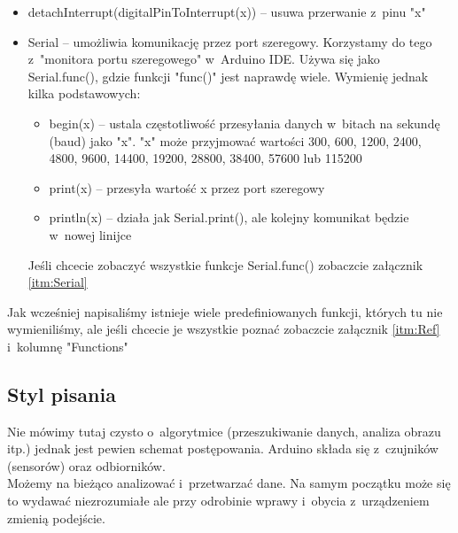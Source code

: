 \documentclass[a4paper,12pt, twoside]{article}
\begin{document}
\begin{itemize}
		\item detachInterrupt(digitalPinToInterrupt(x)) -- usuwa przerwanie z~pinu "x"
		\item Serial -- umożliwia komunikację przez port szeregowy. Korzystamy do tego z~"monitora portu szeregowego" w~Arduino IDE. Używa się jako Serial.func(), gdzie funkcji "func()" jest naprawdę wiele. Wymienię jednak kilka podstawowych:
			\begin{itemize}
				\item begin(x) -- ustala częstotliwość przesyłania danych w~bitach na sekundę (baud) jako "x". "x" może przyjmować wartości 300, 600, 1200, 2400, 4800, 9600, 14400, 19200, 28800, 38400, 57600 lub 115200
				\item print(x) -- przesyła wartość x przez port szeregowy
				\item println(x) -- działa jak Serial.print(), ale kolejny komunikat będzie w~nowej linijce
			\end{itemize}
			Jeśli chcecie zobaczyć wszystkie funkcje Serial.func() zobaczcie załącznik \ref{itm:Serial}
	\end{itemize}
	Jak wcześniej napisaliśmy istnieje wiele predefiniowanych funkcji, których tu nie wymieniliśmy, ale jeśli chcecie je wszystkie poznać zobaczcie załącznik \ref{itm:Ref} i~kolumnę "Functions"


	\subsection {Styl pisania}
	Nie mówimy tutaj czysto o~algorytmice (przeszukiwanie danych, analiza obrazu itp.) jednak jest pewien schemat postępowania. Arduino składa się z~czujników (sensorów) oraz odbiorników. %
	\\
	Możemy  na bieżąco analizować i~przetwarzać dane. Na samym początku może się to wydawać niezrozumiałe ale przy odrobinie wprawy i~obycia z~urządzeniem zmienią podejście.
		
\end{document}
